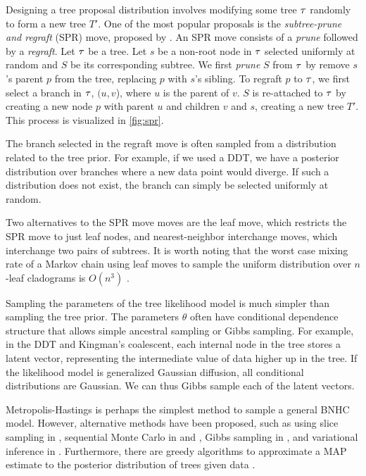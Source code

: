 Designing a tree proposal distribution
involves modifying some tree $\tau$ 
randomly to form a new tree $T'$.
One of the most popular proposals
is the \emph{subtree-prune and regraft} (SPR) move, proposed by \citet{Swofford1990}.
An SPR move consists of a \emph{prune} followed by a \emph{regraft}.
Let $\tau$ be a tree.
Let $s$ be a non-root
node in $\tau$ selected uniformly at random
and $S$ be its corresponding subtree.
We first \emph{prune}
$S$ from $\tau$ by
remove $s$'s parent $p$ from the tree,
replacing $p$ with $s$'s sibling.
To regraft $p$ to $\tau$,
we first select a branch in $\tau$,
$(u, v$), where $u$ is the parent of $v$.
$S$ is re-attached to $\tau$
by creating a new node $p$
with parent $u$ and children $v$ and $s$,
creating a new tree $T'$.
This process is visualized in \autoref{fig:spr}.

The branch selected in the regraft move
is often sampled from a distribution
related to the tree prior.
For example, if we used a DDT,
we have a posterior distribution
over branches where a new data point would 
diverge. If such a distribution
does not exist, the branch can simply
be selected uniformly at random.

Two alternatives to the SPR move
moves are the leaf move,
which restricts the SPR move
to just leaf nodes,
and nearest-neighbor interchange
moves, which interchange
two pairs of subtrees.
It is worth noting
that 
the worst case mixing rate of
a Markov chain using
leaf moves to sample
the uniform distribution over
$n$-leaf cladograms is $O(n^3)$ \citet{Aldous2000}.

Sampling the parameters of 
the tree likelihood model is much simpler
than sampling the tree prior.
The parameters $\theta$ often
have conditional dependence
structure that allows simple
ancestral sampling or Gibbs sampling.
For example, in the DDT and Kingman's coalescent,
each internal node in the tree stores
a latent vector, representing the intermediate value
of data higher up in the tree.
If the likelihood model is
generalized Gaussian diffusion,
all conditional distributions are Gaussian.
We can thus Gibbs sample each of the
latent vectors.

Metropolis-Hastings is perhaps the
simplest method to sample a general
BNHC model. However, alternative methods
have been proposed,
such as using slice sampling in \citet{Adams2010},
sequential Monte Carlo in \citet{Teh2008} and \citet{Hu2013},
Gibbs sampling in \citet{Blei2010},
and variational inference in \citet{Paisley2014}.
Furthermore, there are greedy algorithms
to approximate a MAP estimate
to the posterior distribution
of trees given data \citep{Teh2008, Hu2013}.
